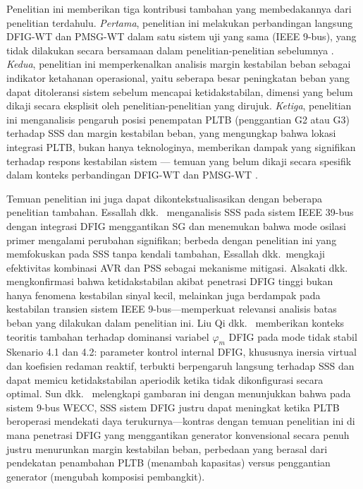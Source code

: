 Penelitian ini memberikan tiga kontribusi tambahan yang membedakannya dari
penelitian terdahulu. \textit{Pertama}, penelitian ini melakukan perbandingan
langsung DFIG-WT dan PMSG-WT dalam satu sistem uji yang sama (IEEE 9-bus), yang
tidak dilakukan secara bersamaan dalam penelitian-penelitian sebelumnya
\cite{mehta2014,gautam2009impact,wu2009small}. \textit{Kedua}, penelitian ini
memperkenalkan analisis margin kestabilan beban sebagai indikator ketahanan
operasional, yaitu seberapa besar peningkatan beban yang dapat ditoleransi sistem
sebelum mencapai ketidakstabilan, dimensi yang belum dikaji secara eksplisit oleh
penelitian-penelitian yang dirujuk. \textit{Ketiga}, penelitian ini menganalisis
pengaruh posisi penempatan PLTB (penggantian G2 atau G3) terhadap SSS dan margin
kestabilan beban, yang mengungkap bahwa lokasi integrasi PLTB, bukan hanya
teknologinya, memberikan dampak yang signifikan terhadap respons kestabilan sistem
--- temuan yang belum dikaji secara spesifik dalam konteks perbandingan DFIG-WT
dan PMSG-WT \cite{he2015investigation}.

Temuan penelitian ini juga dapat dikontekstualisasikan dengan beberapa penelitian
tambahan. Essallah dkk.\ \cite{essallah2019} menganalisis SSS pada sistem IEEE
39-bus dengan integrasi DFIG menggantikan SG dan menemukan bahwa mode osilasi
primer mengalami perubahan signifikan; berbeda dengan penelitian ini yang
memfokuskan pada SSS tanpa kendali tambahan, Essallah dkk.\ mengkaji efektivitas
kombinasi AVR dan PSS sebagai mekanisme mitigasi. Alsakati dkk.\
\cite{alsakati2021} mengkonfirmasi bahwa ketidakstabilan akibat penetrasi DFIG
tinggi bukan hanya fenomena kestabilan sinyal kecil, melainkan juga berdampak
pada kestabilan transien sistem IEEE 9-bus---memperkuat relevansi analisis batas
beban yang dilakukan dalam penelitian ini. Liu Qi dkk.\ \cite{liuqi2023}
memberikan konteks teoritis tambahan terhadap dominansi variabel $\varphi_m$
DFIG pada mode tidak stabil Skenario 4.1 dan 4.2: parameter kontrol internal
DFIG, khususnya inersia virtual dan koefisien redaman reaktif, terbukti
berpengaruh langsung terhadap SSS dan dapat memicu ketidakstabilan aperiodik
ketika tidak dikonfigurasi secara optimal. Sun dkk.\ \cite{sun2013small}
melengkapi gambaran ini dengan menunjukkan bahwa pada sistem 9-bus WECC, SSS
sistem DFIG justru dapat meningkat ketika PLTB beroperasi mendekati daya
terukurnya---kontras dengan temuan penelitian ini di mana penetrasi DFIG yang
menggantikan generator konvensional secara penuh justru menurunkan margin
kestabilan beban, perbedaan yang berasal dari pendekatan penambahan PLTB
(menambah kapasitas) versus penggantian generator (mengubah komposisi
pembangkit).


